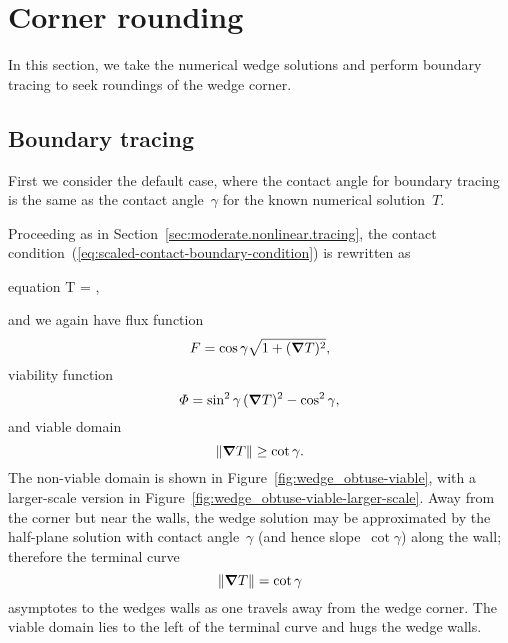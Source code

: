 \section{Corner rounding}
\label{sec:re-entrant.rounding}

In this section,
we take the numerical wedge solutions
and perform boundary tracing
to seek roundings of the wedge corner.

\subsection{Boundary tracing}
\label{sec:re-entrant.rounding.tracing}

First we consider the default case,
where the contact angle for boundary tracing
is the same as the contact angle~$\gamma$
for the known numerical solution~$T$.

Proceeding as in Section~\ref{sec:moderate.nonlinear.tracing},
the contact condition~(\ref{eq:scaled-contact-boundary-condition})
is rewritten as
\begin{important}{equation}
  \normalvec \dotp \del T = \cos\gamma {},
  \label{eq:re-entrant-flux-boundary-condition}
\end{important}
and we again have flux function
\begin{equation}
  F = \cos\gamma \sqrt{1 + (\mathop{}\!\boldsymbol{\mathbf{\nabla}} T)^2},
  \label{eq:re-entrant-flux-function}
\end{equation}
viability function
\begin{equation}
  \varPhi = \sin^2\gamma \, (\mathop{}\!\boldsymbol{\mathbf{\nabla}} T)^2 - \cos^2\gamma,
  \label{eq:re-entrant-viability-function}
\end{equation}
and viable domain
\begin{equation}
  \lVert\mathop{}\!\boldsymbol{\mathbf{\nabla}} T\rVert \ge \cot\gamma.
  \label{eq:re-entrant-viable-domain}
\end{equation}
The non-viable domain is shown
in Figure~\ref{fig:wedge_obtuse-viable},
with a larger-scale version
in Figure~\ref{fig:wedge_obtuse-viable-larger-scale}.
Away from the corner but near the walls,
the wedge solution may be approximated by the half-plane solution
with contact angle~$\gamma$
(and hence slope~$\cot\gamma$)
along the wall;
therefore the terminal curve
\begin{equation}
  \lVert\mathop{}\!\boldsymbol{\mathbf{\nabla}} T\rVert = \cot\gamma
  \label{eq:re-entrant-terminal-curve}
\end{equation}
asymptotes to the wedges walls as one travels away from the wedge corner.
The viable domain lies to the left of the terminal curve
and hugs the wedge walls.

